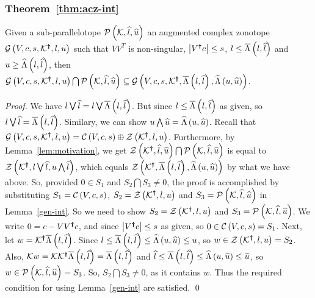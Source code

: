 \subsubsection*{Theorem~\ref{thm:acz-int}}
Given a sub-parallelotope $\mathcal{P}\left(\mathcal{K},\widehat{l},\widehat{u}\right)$ an
augmented complex zonotope $\mathcal{G}\left(V,c,s,\mathcal{K}^{\bm{\dagger}},l,u\right)$
such that $VV^T$ is non-singular, $\left|V^{\bm{\dagger}}c\right|\leq s$, $l\leq
\overline{\Lambda}\left(l,\widehat{l}\right)$ and $u\geq \widehat{\Lambda}\left(l,\widehat{l}\right)$, then
$\mathcal{G}\left(V,c,s,\mathcal{K}^{\bm{\dagger}},l,u\right)\bigcap\mathcal{P}\left(\mathcal{K},\widehat{l},\widehat{u}\right)\subseteq
\mathcal{G}\left(V,c,s,\mathcal{K}^{\bm{\dagger}},\overline{\Lambda}\left(l,\widehat{l}\right),\widehat{\Lambda}\left(u,\widehat{u}\right)\right)$.
%
\begin{proof}
  We have $l\bigvee\widehat{l} = l\bigvee \overline{\Lambda}\left(l,\widehat{l}\right)$.  But
  since $l\leq \overline{\Lambda}\left(l,\widehat{l}\right)$ as given, so
  $l\bigvee\widehat{l}=\overline{\Lambda}\left(l,\widehat{l}\right)$. Similary, we can show
  $u\bigwedge \widehat{u}=\widehat{\Lambda}\left(u,\widehat{u}\right)$.  Recall that
  $\mathcal{G}\left(V,c,s,\mathcal{K}^{\bm{\dagger}},l,u\right)=\mathcal{C}\left(V,c,s\right)\oplus\mathcal{Z}\left(\mathcal{K}^{\bm{\dagger}},l,u\right)$.
  Furthermore, by Lemma~\ref{lem:motivation}, we get
  $\mathcal{Z}\left(\mathcal{K}^{\bm{\dagger}},\widehat{l},\widehat{u}\right)\bigcap\mathcal{P}\left(\mathcal{K},\widehat{l},\widehat{u}\right)$
  is equal to
  $\mathcal{Z}\left(\mathcal{K}^{\bm{\dagger}},l\bigvee\widehat{l},u\bigwedge{\widehat{l}}\right)$, which
  equals $\mathcal{Z}\left(\mathcal{K}^{\bm{\dagger}},\overline{\Lambda}\left(l,\widehat{l}\right),\widehat{\Lambda}\left(u,\widehat{u}\right)\right)$
  by what we have above.  So, provided $0\in S_1$ and $S_2\bigcap
  S_3\neq 0$, the proof is accomplished by substituting
  $S_1=\mathcal{C}\left(V,c,s\right)$, $S_2=\mathcal{Z}\left(\mathcal{K}^{\bm{\dagger}},l,u\right)$ and
  $S_3=\mathcal{P}\left(\mathcal{K},\widehat{l},\widehat{u}\right)$ in Lemma~\ref{gen-int}.
  So we need to show $S_2=\mathcal{Z}\left(\mathcal{K}^{\bm{\dagger}},l,u\right)$ and
  $S_3=\mathcal{P}\left(\mathcal{K},\widehat{l},\widehat{u}\right)$.  We write $0 =
  c-VV^{\bm{\dagger}}c$, and since $\left|V^{\bm{\dagger}}c\right|\leq s$ as given, so
  $0\in \mathcal{C}\left(V,c,s\right)=S_1$.  Next, let
  $w=\mathcal{K}^{\bm{\dagger}}\overline{\Lambda}\left(l,\widehat{l}\right)$.  Since $l\leq
  \overline{\Lambda}\left(l,\widehat{l}\right)\leq \widehat{\Lambda}\left(u,\widehat{u}\right)\leq u$, so
  $w\in\mathcal{Z}\left(\mathcal{K}^{\bm{\dagger}},l,u\right)= S_2$.  Also, $\mathcal{K}
  w=\mathcal{K}\mathcal{K}^{\bm{\dagger}}\overline{\Lambda}\left(l,\widehat{l}\right) =
  \overline{\Lambda}\left(l,\widehat{l}\right)$ and $\widehat{l}\leq \overline{\Lambda}\left(l,\widehat{l}\right)\leq
  \widehat{\Lambda}\left(u,\widehat{u}\right)\leq \widehat{u}$, so $w\in
  \mathcal{P}\left(\mathcal{K},\widehat{l},\widehat{u}\right)=S_3$.  So, $S_2\bigcap S_3\neq
  0$, as it contains $w$.  Thus the required condition for using
  Lemma~\ref{gen-int} are satisfied. \qed
\end{proof}

